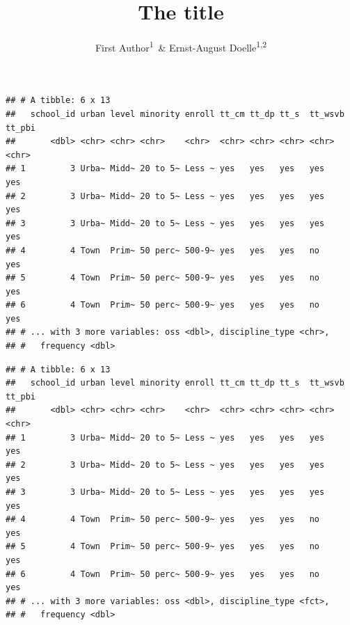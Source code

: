 \documentclass[man]{apa6}
\title{The title}
\author{First Author\textsuperscript{1}~\& Ernst-August
Doelle\textsuperscript{1,2}}
\date{}
\affiliation{
\vspace{0.5cm}
\textsuperscript{1} Wilhelm-Wundt-University\\\textsuperscript{2} Konstanz Business School}
\begin{document}
\maketitle

\begin{verbatim}
## # A tibble: 6 x 13
##   school_id urban level minority enroll tt_cm tt_dp tt_s  tt_wsvb tt_pbi
##       <dbl> <chr> <chr> <chr>    <chr>  <chr> <chr> <chr> <chr>   <chr> 
## 1         3 Urba~ Midd~ 20 to 5~ Less ~ yes   yes   yes   yes     yes   
## 2         3 Urba~ Midd~ 20 to 5~ Less ~ yes   yes   yes   yes     yes   
## 3         3 Urba~ Midd~ 20 to 5~ Less ~ yes   yes   yes   yes     yes   
## 4         4 Town  Prim~ 50 perc~ 500-9~ yes   yes   yes   no      yes   
## 5         4 Town  Prim~ 50 perc~ 500-9~ yes   yes   yes   no      yes   
## 6         4 Town  Prim~ 50 perc~ 500-9~ yes   yes   yes   no      yes   
## # ... with 3 more variables: oss <dbl>, discipline_type <chr>,
## #   frequency <dbl>
\end{verbatim}

\begin{verbatim}
## # A tibble: 6 x 13
##   school_id urban level minority enroll tt_cm tt_dp tt_s  tt_wsvb tt_pbi
##       <dbl> <chr> <chr> <chr>    <chr>  <chr> <chr> <chr> <chr>   <chr> 
## 1         3 Urba~ Midd~ 20 to 5~ Less ~ yes   yes   yes   yes     yes   
## 2         3 Urba~ Midd~ 20 to 5~ Less ~ yes   yes   yes   yes     yes   
## 3         3 Urba~ Midd~ 20 to 5~ Less ~ yes   yes   yes   yes     yes   
## 4         4 Town  Prim~ 50 perc~ 500-9~ yes   yes   yes   no      yes   
## 5         4 Town  Prim~ 50 perc~ 500-9~ yes   yes   yes   no      yes   
## 6         4 Town  Prim~ 50 perc~ 500-9~ yes   yes   yes   no      yes   
## # ... with 3 more variables: oss <dbl>, discipline_type <fct>,
## #   frequency <dbl>
\end{verbatim}
\end{document}
